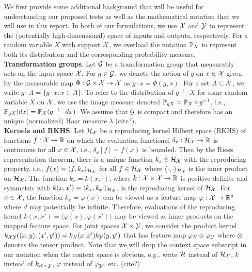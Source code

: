 We first provide some additional background that will be useful for understanding our proposed tests as well as the mathematical notation that we will use in this report. In both of our formulations, we use $\calX$ and $\calY$ to represent the (potentially high-dimensional) space of inputs and outputs, respectively. For a random variable $X$ with support $\calX$, we overload the notation $\P_X$ to represent both its distribution and the corresponding probability measure.
\\

\textbf{Transformation groups}. Let $\calG$ be a transformation group that measurably acts on the input space $\calX$. For $g\in\calG$, we denote the action of $g$ on $x\in\calX$ given by the measurable map $\Phi:\calG\times\calX\rightarrow\calX$ as $g\cdot x = \Phi(g,x)$. For a set $A\subset\calX$, we write $g\cdot A=\{g\cdot x: x\in A\}$. To refer to the distribution of $g^{-1}\cdot X$ for some random variable $X$ on $\calX$, we use the image measure denoted $\P_{gX}=\P_X\circ g^{-1}$, i.e., $\P_{gX}(dx)=\P_X(g^{-1}\cdot dx)$. We assume that $\calG$ is compact and therefore has an unique (normalized) Haar measure $\lambda$ (\todo cite?).
\\

\textbf{Kernels and RKHS}. Let $\calH_\calX$ be a reproducing kernel Hilbert space (RKHS) of functions $f:\calX\rightarrow\bbR$ on which the evaluation functional $\delta_x:\calH_\calX\rightarrow\bbR$ is continuous for all $x\in\calX$, i.e., $\delta_x[f]=f(x)$ is bounded. Then by the Riesz representation theorem, there is a unique function $k_x\in\calH_\calX$ with the reproducing property, i.e., $f(x)=\langle f,k_x\rangle_{\calH_\calX}$ for all $f\in\calH_\calX$ where $\langle\cdot,\cdot\rangle_{\calH_\calX}$ is the inner product on $\calH_{\calX}$. The function $k_x=k(x,\cdot)$, where $k:\calX\times\calX\rightarrow\bbR$ is positive definite and symmetric with $k(x,x')=\langle k_x,k_{x'}\rangle_{\calH_\calX}$, is the reproducing kernel of $\calH_\calX$. For $x\in\calX$, the function $k_x=\varphi(x)$ can be viewed as a feature map $\varphi:\calX\rightarrow\bbR^d$ where $d$ may potentially be infinite. Therefore, evaluations of the reproducing kernel $k(x,x')=\langle \varphi(x),\varphi(x')\rangle$ may be viewed as inner products on the mapped feature space. For joint spaces $\calX\times\calY$, we consider the product kernel $k_{\calX\calY}((x,y),(x',y'))=k_\calX(x,x')k_\calY(y,y')$ that has feature map $\varphi_\calX\otimes\varphi_\calY$ where $\otimes$ denotes the tensor product. Note that we will drop the context space subscript in our notation when the context space is obvious, e.g., write $\calH$ instead of $\calH_\calX$, $k$ instead of $k_{\calX\times\calY}$, $\varphi$ instead of $\varphi_\calY$, etc. (\todo cite?)
\\

